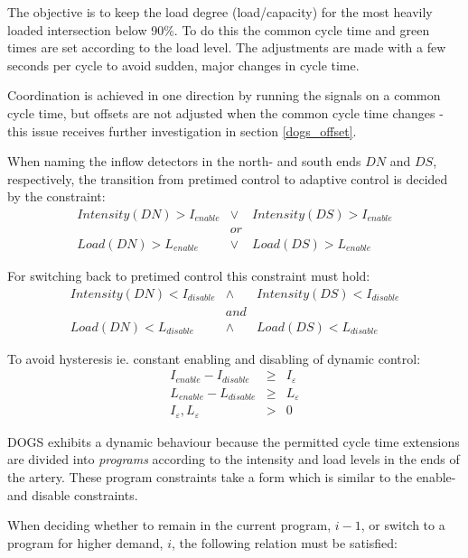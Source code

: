 The objective is to keep the load degree (load/capacity) for the most heavily loaded intersection below 90\%.
To do this the common cycle time and green times are set according to the load level. The adjustments are made with a few seconds per cycle to avoid sudden, major changes in cycle time.

Coordination is achieved in one direction by running the signals on a common cycle time, but offsets are not adjusted when the common cycle time changes - this issue receives further investigation in section \ref{dogs_offset}.

When naming the inflow detectors in the north- and south ends $DN$ and $DS$, respectively, the transition from pretimed control to adaptive control is decided by the constraint:
\begin{eqnarray*}
Intensity(DN) > I_{enable} & \vee & Intensity(DS) > I_{enable} \\
& or & \\
Load(DN) > L_{enable} & \vee & Load(DS) > L_{enable}
\end{eqnarray*}

For switching back to pretimed control this constraint must hold:
\begin{eqnarray*}
Intensity(DN) < I_{disable} & \wedge & Intensity(DS) < I_{disable} \\
& and & \\
Load(DN) < L_{disable} & \wedge & Load(DS) < L_{disable}
\end{eqnarray*}

To avoid hysteresis ie. constant enabling and disabling of dynamic control:
\begin{eqnarray}
I_{enable} - I_{disable} & \geq & I_{\varepsilon} \label{eqn:hysteresis_intensity} \\ 
L_{enable} - L_{disable} & \geq & L_{\varepsilon} \label{eqn:hysteresis_load} \\
I_{\varepsilon},L_{\varepsilon} & > & 0 \label{eqn:hysteresis_limits}
\label{eqn:hysteresis}
\end{eqnarray}

DOGS exhibits a dynamic behaviour because the permitted cycle time extensions are divided into \textit{programs} according to the intensity and load levels in the ends of the artery. These program constraints take a form which is similar to the enable- and disable constraints.

When deciding whether to remain in the current program, $i-1$, or switch to a program for higher demand, $i$, the following relation must be satisfied:

